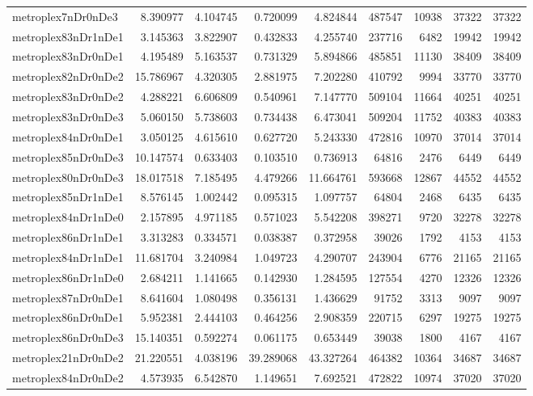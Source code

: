 \begin{longtable}{|l|r|r|r|r|r|r|r|r|}
metroplex7nDr0nDe3 & 8.390977 & 4.104745 & 0.720099 & 4.824844 & 487547 & 10938 & 37322 & 37322 \\
metroplex83nDr1nDe1 & 3.145363 & 3.822907 & 0.432833 & 4.255740 & 237716 & 6482 & 19942 & 19942 \\
metroplex83nDr0nDe1 & 4.195489 & 5.163537 & 0.731329 & 5.894866 & 485851 & 11130 & 38409 & 38409 \\
metroplex82nDr0nDe2 & 15.786967 & 4.320305 & 2.881975 & 7.202280 & 410792 & 9994 & 33770 & 33770 \\
metroplex83nDr0nDe2 & 4.288221 & 6.606809 & 0.540961 & 7.147770 & 509104 & 11664 & 40251 & 40251 \\
metroplex83nDr0nDe3 & 5.060150 & 5.738603 & 0.734438 & 6.473041 & 509204 & 11752 & 40383 & 40383 \\
metroplex84nDr0nDe1 & 3.050125 & 4.615610 & 0.627720 & 5.243330 & 472816 & 10970 & 37014 & 37014 \\
metroplex85nDr0nDe3 & 10.147574 & 0.633403 & 0.103510 & 0.736913 & 64816 & 2476 & 6449 & 6449 \\
metroplex80nDr0nDe3 & 18.017518 & 7.185495 & 4.479266 & 11.664761 & 593668 & 12867 & 44552 & 44552 \\
metroplex85nDr1nDe1 & 8.576145 & 1.002442 & 0.095315 & 1.097757 & 64804 & 2468 & 6435 & 6435 \\
metroplex84nDr1nDe0 & 2.157895 & 4.971185 & 0.571023 & 5.542208 & 398271 & 9720 & 32278 & 32278 \\
metroplex86nDr1nDe1 & 3.313283 & 0.334571 & 0.038387 & 0.372958 & 39026 & 1792 & 4153 & 4153 \\
metroplex84nDr1nDe1 & 11.681704 & 3.240984 & 1.049723 & 4.290707 & 243904 & 6776 & 21165 & 21165 \\
metroplex86nDr1nDe0 & 2.684211 & 1.141665 & 0.142930 & 1.284595 & 127554 & 4270 & 12326 & 12326 \\
metroplex87nDr0nDe1 & 8.641604 & 1.080498 & 0.356131 & 1.436629 & 91752 & 3313 & 9097 & 9097 \\
metroplex86nDr0nDe1 & 5.952381 & 2.444103 & 0.464256 & 2.908359 & 220715 & 6297 & 19275 & 19275 \\
metroplex86nDr0nDe3 & 15.140351 & 0.592274 & 0.061175 & 0.653449 & 39038 & 1800 & 4167 & 4167 \\
metroplex21nDr0nDe2 & 21.220551 & 4.038196 & 39.289068 & 43.327264 & 464382 & 10364 & 34687 & 34687 \\
metroplex84nDr0nDe2 & 4.573935 & 6.542870 & 1.149651 & 7.692521 & 472822 & 10974 & 37020 & 37020 \\

\end{longtable}
